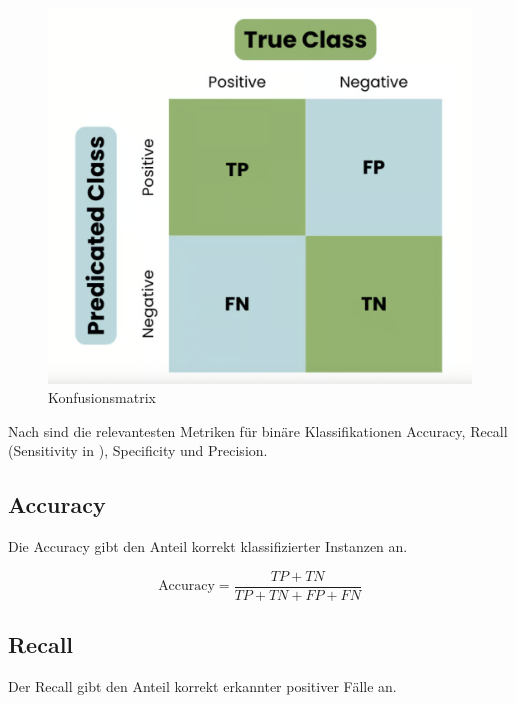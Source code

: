\begin{figure}[htbp]
    \begin{center}
        \includegraphics[scale=0.3]{static/confusion_matrix.png}
        \caption[Konfusionsmatrix]{\label{fig:confusion_matrix} Konfusionsmatrix \cite{datacamp_confusion_matrix_tutorial}}
    \end{center}
\end{figure}

Nach \cite{kivimaeki2025, Rainio:2024aa} sind die relevantesten Metriken für binäre Klassifikationen Accuracy, Recall (Sensitivity in \cite{Rainio:2024aa}), 
Specificity und Precision. 

\subsection{Accuracy}

Die Accuracy gibt den Anteil korrekt klassifizierter Instanzen an.

\begin{equation}
    \text{Accuracy} = \frac{TP + TN}{TP + TN + FP + FN}
\end{equation}

\subsection{Recall}

Der Recall gibt den Anteil korrekt erkannter positiver Fälle an.

